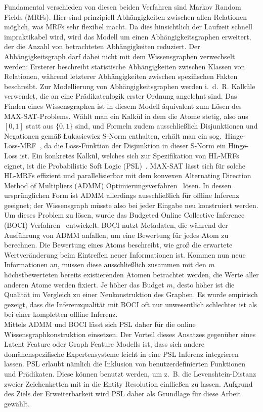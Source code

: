 \documentclass[11pt, a4paper]{scrreprt}
\begin{document}
Fundamental verschieden von diesen beiden Verfahren sind Markov Random Fields (MRFs).
Hier sind prinzipiell Abhängigkeiten zwischen allen Relationen möglich, was MRFs sehr flexibel macht.
Da dies hinsichtlich der Laufzeit schnell impraktikabel wird, wird das Modell um einen Abhängigkeitsgraphen erweitert, der die Anzahl von betrachteten Abhängigkeiten reduziert.
Der Abhängigkeitsgraph darf dabei nicht mit dem Wissensgraphen verwechselt werden:
Ersterer beschreibt statistische Abhängigkeiten zwischen Klassen von Relationen, während letzterer Abhängigkeiten zwischen spezifischen Fakten beschreibt.
Zur Modellierung von Abhängigkeitsgraphen werden i.~d.~R. Kalküle verwendet, die an eine Prädikatenlogik erster Ordnung angelehnt sind.
Das Finden eines Wissensgraphen ist in diesem Modell äquivalent zum Lösen des MAX-SAT-Problems.
Wählt man ein Kalkül in dem die Atome stetig, also aus $[0, 1]$ statt aus $\{0, 1\}$ sind, und Formeln zudem ausschließlich Disjunktionen und Negationen gemäß Łukasiewicz S-Norm enthalten, erhält man ein sog.\ Hinge-Loss-MRF~\cite{bach:2013}, da die Loss-Funktion der Disjunktion in dieser S-Norm ein Hinge-Loss ist.
Ein konkretes Kalkül, welches sich zur Spezifikation von HL-MRFs eignet, ist die Probabilistic Soft Logic (PSL)~\cite{brocheler:2010}.
MAX-SAT lässt sich für solche HL-MRFs effizient und parallelisierbar mit dem konvexen Alternating Direction Method of Multipliers (ADMM) Optimierungsverfahren~\cite{boyd:2011} lösen.
In dessen ursprünglichen Form ist ADMM allerdings ausschließlich für offline Inferenz geeignet;
der Wissensgraph müsste also bei jeder Eingabe neu konstruiert werden.
Um dieses Problem zu lösen, wurde das Budgeted Online Collective Inference (BOCI) Verfahren~\cite{pujara:2015} entwickelt.
BOCI nutzt Metadaten, die während der Ausführung von ADMM anfallen, um eine Bewertung für jedes Atom zu berechnen.
Die Bewertung eines Atoms beschreibt, wie groß die erwartete Wertveränderung beim Eintreffen neuer Informationen ist.
Kommen nun neue Informationen an, müssen diese ausschließlich zusammen mit den $m$ höchstbewerteten bereits existierenden Atomen betrachtet werden, die Werte aller anderen Atome werden fixiert.
Je höher das Budget $m$, desto höher ist die Qualität im Vergleich zu einer Neukonstruktion des Graphen.
Es wurde empirisch gezeigt, dass die Inferenzqualität mit BOCI oft nur unwesentlich schlechter ist als bei einer kompletten offline Inferenz.\\

Mittels ADMM und BOCI lässt sich PSL daher für die online Wissensgraphkonstruktion einsetzen.
Der Vorteil dieses Ansatzes gegenüber eines Latent Feature oder Graph Feature Modells ist, dass sich andere domänenspezifische Expertensysteme leicht in eine PSL Inferenz integrieren lassen.
PSL erlaubt nämlich die Inklusion von benutzerdefinierten Funktionen und Prädikaten.
Diese können benutzt werden, um z.~B. die Levenshtein-Distanz zweier Zeichenketten mit in die Entity Resolution einfließen zu lassen.
Aufgrund des Ziels der Erweiterbarkeit wird PSL daher als Grundlage für diese Arbeit gewählt.
\end{document}
